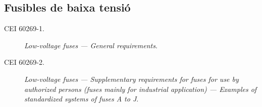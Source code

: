 \subsection*{Fusibles de baixa tensió}
\begin{description}
    \item [\hspace{5mm}CEI 60269-1.] \textit{Low-voltage fuses --- General requirements}.
    \item [\hspace{5mm}CEI 60269-2.] \textit{Low-voltage fuses --- Supplementary requirements for fuses for use by authorized persons
          (fuses mainly for industrial application) --- Examples of standardized systems of fuses A to J}.
\end{description}

